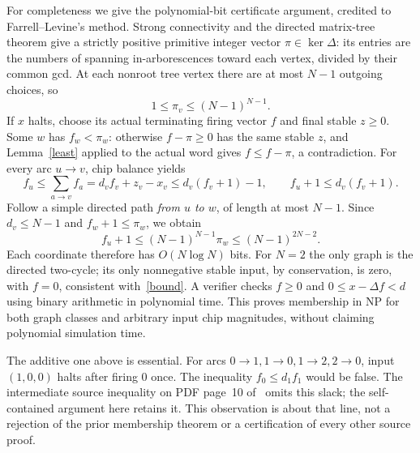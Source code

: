 \documentclass[11pt]{article}
\begin{document}
For completeness we give the polynomial-bit certificate argument, credited to
Farrell--Levine's method. Strong connectivity and the directed matrix-tree
theorem give a strictly positive primitive integer vector $\pi\in\ker\Delta$:
its entries are the numbers of spanning in-arborescences toward each vertex,
divided by their common gcd. At each nonroot tree vertex there are at most
$N-1$ outgoing choices, so
\begin{equation}\label{period}
1\le\pi_v\le(N-1)^{N-1}.
\end{equation}
If $x$ halts, choose its actual terminating firing vector $f$ and final stable
$z\ge0$. Some $w$ has $f_w<\pi_w$: otherwise $f-\pi\ge0$ has the same stable
$z$, and Lemma~\ref{least} applied to the actual word gives
$f\le f-\pi$, a contradiction. For every arc $u\to v$, chip balance yields
\[
 f_u\le\sum_{a\to v}f_a=d_v f_v+z_v-x_v
 \le d_v(f_v+1)-1,
 \qquad f_u+1\le d_v(f_v+1).
\]
Follow a simple directed path \emph{from $u$ to $w$}, of length at most $N-1$.
Since $d_v\le N-1$ and $f_w+1\le\pi_w$, we obtain
\begin{equation}\label{bound}
 f_u+1\le (N-1)^{N-1}\pi_w\le(N-1)^{2N-2}.
\end{equation}
Each coordinate therefore has $O(N\log N)$ bits. For $N=2$ the only graph is
the directed two-cycle; its only nonnegative stable input, by conservation,
is zero, with $f=0$, consistent with~\eqref{bound}. A verifier checks
$f\ge0$ and $0\le x-\Delta f<d$ using binary arithmetic in polynomial time.
This proves membership in NP for both graph classes and arbitrary input chip
magnitudes, without claiming polynomial simulation time.

The additive one above is essential. For arcs $0\to1,1\to0,1\to2,2\to0$,
input $(1,0,0)$ halts after firing $0$ once. The inequality $f_0\le d_1f_1$
would be false. The intermediate source inequality on PDF page~10
of~\cite{FL} omits this slack; the self-contained argument here retains it.
This observation is about that line, not a rejection of the prior membership
theorem or a certification of every other source proof.
\end{document}
